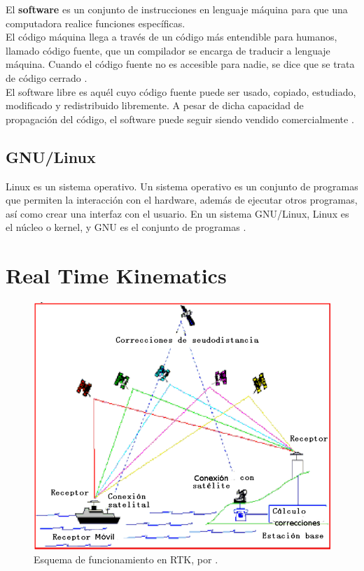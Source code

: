 El \textbf{software} es un conjunto de instrucciones en lenguaje máquina para que una computadora realice funciones específicas.\\

El código máquina llega a través de un código más entendible para humanos, llamado código fuente, que un compilador se encarga de traducir a lenguaje máquina. Cuando el código fuente no es accesible para nadie, se dice que se trata de código cerrado \citep{i2005software}.\\

El software libre es aquél cuyo código fuente puede ser usado, copiado, estudiado, modificado y redistribuido libremente. A pesar de dicha capacidad de propagación del código, el software puede seguir siendo vendido comercialmente \citep{garcia2007promocion}. 

\subsection{GNU/Linux}
Linux es un sistema operativo. Un sistema operativo es un conjunto de programas que permiten la interacción con el hardware, además de ejecutar otros programas, así como crear una interfaz con el usuario. En un sistema GNU/Linux, Linux es el núcleo o kernel, y GNU es el conjunto de programas \citep{debian}. 


\section{Real Time Kinematics}

\begin{figure}[H]
\centering
\includegraphics[scale=0.53]{Figures/DGPS1}
\caption[Esquema de funcionamiento en RTK.]{Esquema de funcionamiento en RTK, por \cite{fallas2002sistema}.}
\label{fig:RTK}
\end{figure}

